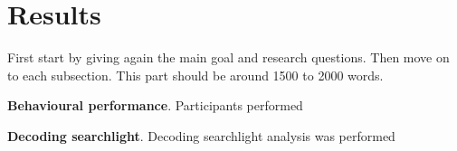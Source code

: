

\section*{Results}

First start by giving again the main goal and research questions. Then move on to each subsection. This part should be around 1500 to 2000 words.

\noindent\textbf{Behavioural performance}. Participants performed \lipsum[8-9]

\vspace{5mm} %

\noindent\textbf{Decoding searchlight}. Decoding searchlight analysis was performed \lipsum[4-7]

